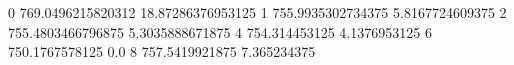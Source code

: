 0 769.0496215820312 18.87286376953125
1 755.9935302734375 5.8167724609375
2 755.4803466796875 5.3035888671875
4 754.314453125 4.1376953125
6 750.1767578125 0.0
8 757.5419921875 7.365234375
